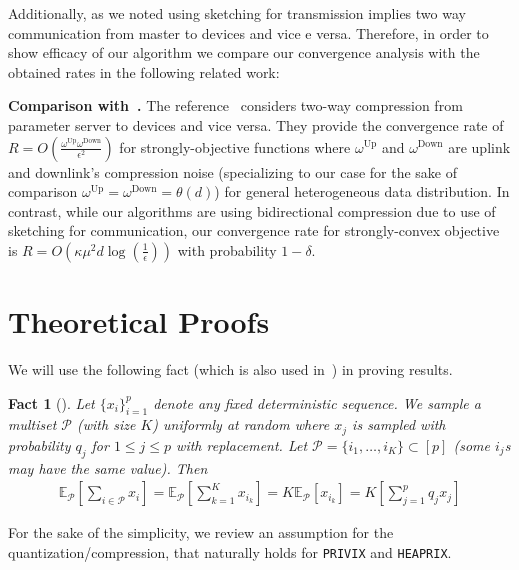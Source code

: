 \documentclass[11pt]{article}
\newtheorem{fact}[theorem]{Fact}
\begin{document}
Additionally, as we noted using sketching for transmission implies two way communication from master to devices and vice e versa. Therefore, in order to show efficacy of our algorithm we compare our convergence analysis with the obtained rates in the following related work:

\textbf{Comparison with~\citet{philippenko2020artemis}.} 
The reference~\citep{philippenko2020artemis} considers two-way compression from parameter server to devices and vice versa. They provide the convergence rate of $R=O\left(\frac{\omega^{\text{Up}}\omega^{\text{Down}}}{\epsilon^2}\right)$ for strongly-objective functions where $\omega^{\text{Up}}$ and $\omega^{\text{Down}}$ are uplink and downlink's compression noise (specializing to our case for the sake of comparison $\omega^{\text{Up}}=\omega^{\text{Down}}=\theta\left(d\right)$) for general heterogeneous data distribution. In contrast, while our algorithms are using bidirectional compression due to use of sketching for communication, our convergence rate for strongly-convex objective is $R=O(\kappa\mu^2d\log\left(\frac{1}{\epsilon}\right))$ with probability $1-\delta$.  

\section{Theoretical Proofs}





We will use the following fact (which is also used in~\citet{li2019convergence,haddadpour2019convergence}) in proving results.
\begin{fact}[\citet{li2019convergence,haddadpour2019convergence}]\label{fact:1}
Let
$\{x_i\}_{i=1}^p$ denote any fixed deterministic sequence. We sample a multiset $\mathcal{P}$ (with size $K$) uniformly at random where $x_j$ is sampled  with probability $q_j$ for $1\leq j\leq p$ with replacement.  Let $\mathcal{P} = \{i_1,\ldots, i_K\} \subset[p]$ (some $i_j$s may have the same value). Then
\begin{align}
    \mathbb{E}_{\mathcal{P}}\left[\sum_{i\in \mathcal{P}}x_i\right]=\mathbb{E}_{\mathcal{P}}\left[\sum_{k=1}^Kx_{i_k}\right]=K\mathbb{E}_{\mathcal{P}}\left[x_{i_k}\right]=K\left[\sum_{j=1}^pq_jx_j\right]
\end{align}
\end{fact}
For the sake of the simplicity, we review an assumption for the quantization/compression, that naturally holds for \texttt{PRIVIX} and \texttt{HEAPRIX}.
\end{document}
